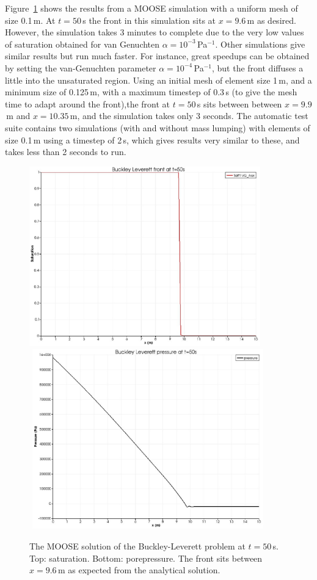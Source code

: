 \documentclass[]{scrreprt}
\begin{document}
Figure~\ref{satfront.figa} shows the results from a MOOSE simulation
with a uniform mesh of size 0.1\,m.  At $t=50$\,s the front in this
simulation sits at $x=9.6$\,m as desired.  However, the simulation
takes 3 minutes to complete due to the very low values of saturation
obtained for van Genuchten $\alpha=10^{-3}$\,Pa$^{-1}$.  Other
simulations give similar results but run much faster.  For instance,
great speedups can be obtained by setting the van-Genuchten parameter
$\alpha=10^{-4}$\,Pa$^{-1}$, but the front diffuses a little into the
unsaturated region.  Using an initial mesh of element size 1\,m, and a
minimum size of 0.125\,m, with a maximum timestep of 0.3\,s (to give
the mesh time to adapt around the front),the front at $t=50$\,s sits
between between $x=9.9$\,m and $x=10.35$\,m, and the simulation takes
only 3 seconds.  The automatic test suite contains two simulations
(with and without mass lumping) with
elements of size 0.1\,m using a timestep of 2\,s, which gives results
very similar to these, and takes less than 2 seconds to run.

\begin{figure}[htb]
\begin{center}
\includegraphics[width=10cm]{bl_seff.eps} \\
$\mbox{}$
\includegraphics[width=10cm]{bl_p.eps} \\
\caption{The MOOSE solution of the Buckley-Leverett problem at
  $t=50$\,s.  Top: saturation.  Bottom: porepressure.  The front sits
  between $x=9.6$\,m as expected from the analytical solution.}
\label{satfront.figa}
\end{center}
\end{figure}
\end{document}
